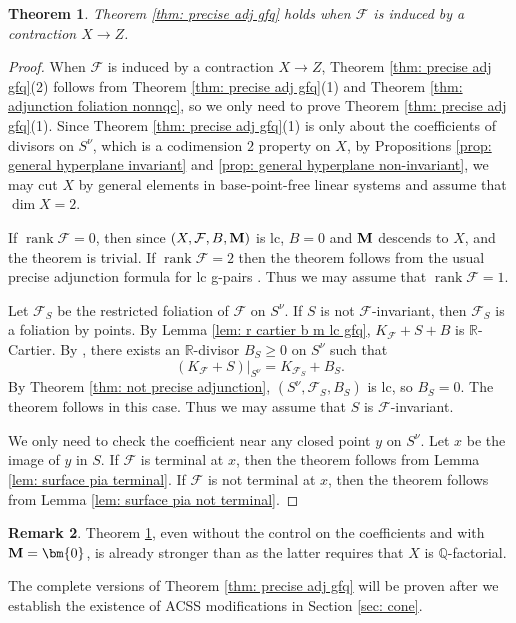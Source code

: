 \documentclass[11pt]{amsart}
\numberwithin{equation}{section}
\newcommand{\Mm}{{\bf{M}}}
\newcommand{\Qq}{\mathbb{Q}}
\newcommand{\Rr}{\mathbb{R}}
\newcommand{\rk}{\operatorname{rank}}
\newcommand{\Ff}{\mathcal{F}}
\newtheorem{thm}{Theorem}[subsection]
\theoremstyle{definition}
\theoremstyle{definition}
\newtheorem{rem}[thm]{Remark}
\theoremstyle{definition}
\begin{document}
\begin{thm}\label{thm: precise adjunction when induced}
   Theorem \ref{thm: precise adj gfq} holds when $\Ff$ is induced by a contraction $X\rightarrow Z$. 
\end{thm}
\begin{proof}
When $\Ff$ is induced by a contraction $X\rightarrow Z$, Theorem \ref{thm: precise adj gfq}(2) follows from Theorem \ref{thm: precise adj gfq}(1) and Theorem \ref{thm: adjunction foliation nonnqc}, so we only need to prove Theorem \ref{thm: precise adj gfq}(1). Since Theorem \ref{thm: precise adj gfq}(1) is only about the coefficients of divisors on $S^\nu$, which is a codimension $2$ property on $X$, by Propositions \ref{prop: general hyperplane invariant} and \ref{prop: general hyperplane non-invariant}, we may cut $X$ by general elements in base-point-free linear systems and assume that $\dim X=2$.

If $\rk\Ff=0$, then since $(X,\Ff,B,\Mm)$ is lc, $B=0$ and $\Mm$ descends to $X$, and the theorem is trivial. If $\rk\Ff=2$ then the theorem follows from the usual precise adjunction formula for lc g-pairs \cite[Page 306, Line 30]{BZ16}. Thus we may assume that $\rk\Ff=1$. 

Let $\Ff_S$ be the restricted foliation of $\Ff$ on $S^\nu$. If $S$ is not $\Ff$-invariant, then $\Ff_S$ is a foliation by points. By Lemma \ref{lem: r cartier b m lc gfq}, $K_{\Ff}+S+B$ is $\Rr$-Cartier. By \cite[Proposition 3.4]{Spi20}, there exists an $\Rr$-divisor $B_S\geq 0$ on $S^\nu$ such that
$$(K_{\Ff}+S)|_{S^\nu}=K_{\Ff_S}+B_S.$$ 
By Theorem \ref{thm: not precise adjunction}, $(S^\nu,\Ff_S,B_S)$ is lc, so $B_S=0$. The theorem follows in this case. Thus we may assume that $S$ is $\Ff$-invariant.

We only need to check the coefficient near any closed point $y$ on $S^\nu$. Let $x$ be the image of $y$ in $S$. If $\Ff$ is terminal at $x$, then the theorem follows from Lemma \ref{lem: surface pia terminal}. If $\Ff$ is not terminal at $x$, then the theorem follows from Lemma \ref{lem: surface pia not terminal}.
\end{proof}

\begin{rem}
    Theorem \ref{thm: precise adjunction when induced}, even without the control on the coefficients and with $\Mm=\bm{0}$, is already stronger than \cite[Proposition 3.2]{ACSS21} as the latter requires that $X$ is $\Qq$-factorial. 

    The complete versions of Theorem \ref{thm: precise adj gfq} will be proven after we establish the existence of ACSS modifications in Section \ref{sec: cone}.
\end{rem}
\end{document}

